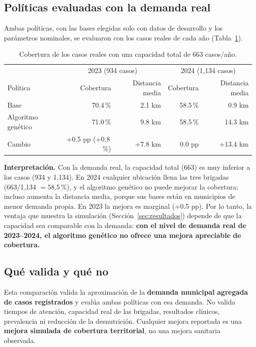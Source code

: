 \documentclass[11pt,letterpaper]{article}
\begin{document}
\subsection{Políticas evaluadas con la demanda real}

Ambas políticas, con las bases elegidas solo con datos de desarrollo y los parámetros nominales, se evaluaron con los casos reales de cada año (Tabla~\ref{tab:real}).

\begin{table}[htbp]
\centering
\small
\begin{tabular}{lrrrr}
\toprule
 & \multicolumn{2}{c}{2023 (934 casos)} & \multicolumn{2}{c}{2024 (1{,}134 casos)} \\
Política & Cobertura & Distancia media & Cobertura & Distancia media \\
\midrule
Base & 70.4\,\% & 2.1 km & 58.5\,\% & 0.9 km \\
Algoritmo genético & 71.0\,\% & 9.8 km & 58.5\,\% & 14.3 km \\
\midrule
Cambio & +0.5 pp (+0.8\,\%) & +7.8 km & 0.0 pp & +13.4 km \\
\bottomrule
\end{tabular}
\caption{Cobertura de los casos reales con una capacidad total de 663 casos/año.}
\label{tab:real}
\end{table}

\textbf{Interpretación.} Con la demanda real, la capacidad total (663) es muy inferior a los casos (934 y 1{,}134). En 2024 cualquier ubicación llena las tres brigadas (663/1{,}134 $=58.5\,\%$), y el algoritmo genético no puede mejorar la cobertura; incluso aumenta la distancia media, porque sus bases están en municipios de menor demanda propia. En 2023 la mejora es marginal (+0.5 pp). Por lo tanto, la ventaja que muestra la simulación (Sección~\ref{sec:resultados}) depende de que la capacidad sea comparable con la demanda: \textbf{con el nivel de demanda real de 2023--2024, el algoritmo genético no ofrece una mejora apreciable de cobertura.}

\subsection{Qué valida y qué no}

Esta comparación valida la aproximación de la \textbf{demanda municipal agregada de casos registrados} y evalúa ambas políticas con esa demanda. No valida tiempos de atención, capacidad real de las brigadas, resultados clínicos, prevalencia ni reducción de la desnutrición. Cualquier mejora reportada es una \textbf{mejora simulada de cobertura territorial}, no una mejora sanitaria observada.
\end{document}
